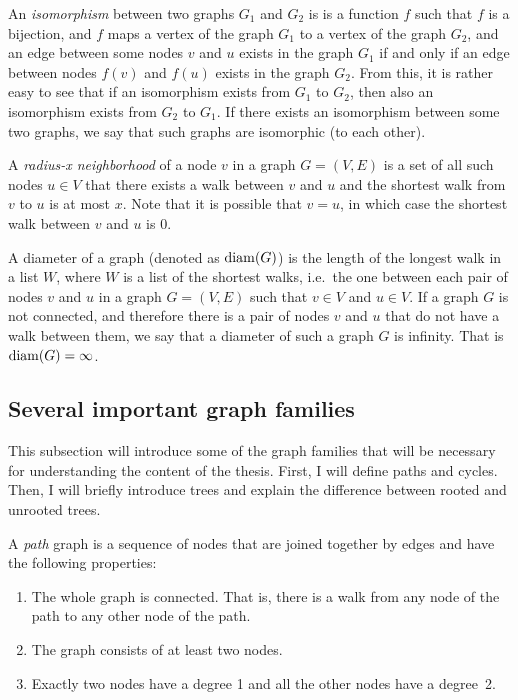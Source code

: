 An \emph{isomorphism} between two graphs $G_1$ and $G_2$ is is a function $f$ such that $f$ is a 
bijection, and $f$ maps a vertex of the graph $G_1$ to a vertex of the graph $G_2$, and 
an edge between some nodes $v$ and $u$ exists in the graph $G_1$ if and only if
an edge between nodes $f(v)$ and $f(u)$ exists in the graph $G_2$. From this,
it is rather easy to see that if an isomorphism exists from $G_1$ to $G_2$, then
also an isomorphism exists from $G_2$ to $G_1$. If there exists an
isomorphism between some two graphs, we say that such graphs are isomorphic
(to each other).

A \emph{radius-x neighborhood} of a node $v$ in a graph $G = (V, E)$ is a set of
all such nodes $u \in V$ that there exists a walk between $v$ and $u$ and 
the shortest walk from $v$ to $u$ is at most $x$. Note that it is possible that
$v = u$, in which case the shortest walk between $v$ and $u$ is 0.

A diameter of a graph (denoted as $\operatorname{diam}(G)$) is the length of the longest walk
in a list $W$, where $W$ is a list of the shortest walks, i.e.\ the one between each pair of nodes
$v$ and $u$ in a graph $G = (V, E)$ such that $v \in V$ and $u \in V$. If a graph
$G$ is not connected, and therefore there is a pair of nodes $v$ and $u$ that do not
have a walk between them, we say that a diameter of such a graph $G$ is infinity. That
is $\operatorname{diam}(G) = \infty$.

\subsection{Several important graph families}

This subsection will introduce some of the graph families that will be necessary
for understanding the content of the thesis. First, I will define paths and cycles.
Then, I will briefly introduce trees and explain the difference between rooted
and unrooted trees.

A \emph{path} graph is a sequence of nodes that are joined together by edges and
have the following properties:

\begin{enumerate}
  \item The whole graph is connected. That is, there is a walk from any node of
  the path to any other node of the path.

  \item The graph consists of at least two nodes.

  \item Exactly two nodes have a degree 1 and all the other nodes have a degree~2.
\end{enumerate}

